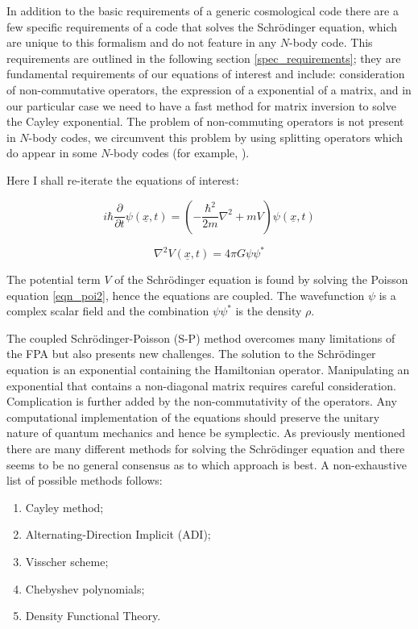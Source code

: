 In addition to the basic requirements of a generic cosmological code there are a few specific requirements of a code that solves the Schr\"odinger equation, which are unique to this formalism and do not feature in any $N$-body code. This requirements are outlined in the following section \ref{spec_requirements}; they are fundamental requirements of our equations of interest and include: consideration of non-commutative operators, the expression of a exponential of a matrix, and in our particular case we need to have a fast method for matrix inversion to solve the Cayley exponential. The problem of non-commuting operators is not present in $N$-body codes, we circumvent this problem by using splitting operators which do appear in some $N$-body codes (for example, \citet{bib_spr}).

Here I shall re-iterate the equations of interest:

\begin{equation}
\label{eqn_schroedinger2}
 i\hbar\frac{\partial}{\partial t}\psi(\underline{x},t) = \left( -\frac{\hbar^2}{2m} \nabla^2 + mV \right) \psi(\underline{x},t)
\end{equation}

\begin{equation}
\label{eqn_poi2}
\nabla^2 V(\underline{x},t) = 4\pi G \psi\psi^*
\end{equation}

\noindent The potential term $V$ of the Schr\"odinger equation is found by solving the Poisson equation \ref{eqn_poi2}, hence the equations are coupled. The wavefunction $\psi$ is a complex scalar field and the combination $\psi\psi^*$ is the density $\rho$.

The coupled Schr\"odinger-Poisson (S-P) method overcomes many limitations of the FPA but also presents new challenges. The solution to the Schr\"odinger equation is an exponential containing the Hamiltonian operator. Manipulating an exponential that contains a non-diagonal matrix requires careful consideration. Complication is further added by the non-commutativity of the operators. Any computational implementation of the equations should preserve the unitary nature of quantum mechanics and hence be symplectic. As previously mentioned there are many different methods for solving the Schr\"odinger equation and there seems to be no general consensus as to which approach is best. A non-exhaustive list of possible methods follows:

\begin{enumerate}
\item Cayley method;
\item Alternating-Direction Implicit (ADI);
\item Visscher scheme;
\item Chebyshev polynomials;
\item Density Functional Theory.
\end{enumerate}

